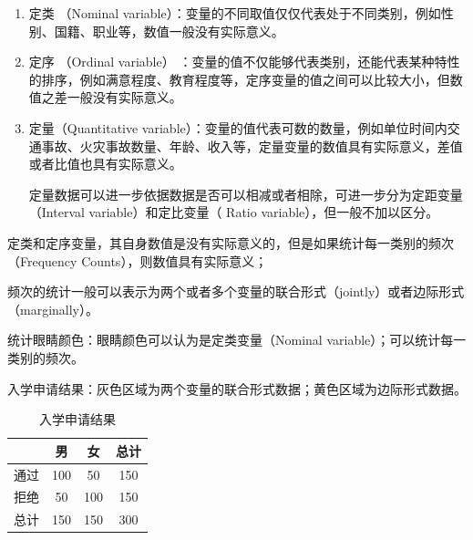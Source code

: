 \begin{enumerate}[itemsep=0pt,parsep=0pt]
    \item 定类 （Nominal variable）：变量的不同取值仅仅代表处于不同类别，例如性别、国籍、职业等，数值一般没有实际意义。
    \item 定序 （Ordinal variable） ：变量的值不仅能够代表类别，还能代表某种特性的排序，例如满意程度、教育程度等，定序变量的值之间可以比较大小，但数值之差一般没有实际意义。
    \item 定量（Quantitative variable）：变量的值代表可数的数量，例如单位时间内交通事故、火灾事故数量、年龄、收入等，定量变量的数值具有实际意义，差值或者比值也具有实际意义。

          定量数据可以进一步依据数据是否可以相减或者相除，可进一步分为定距变量（Interval variable）和定比变量（ Ratio variable），但一般不加以区分。
\end{enumerate}

定类和定序变量，其自身数值是没有实际意义的，但是如果统计每一类别的频次（Frequency Counts），则数值具有实际意义；

频次的统计一般可以表示为两个或者多个变量的联合形式（jointly）或者边际形式（marginally）。

\begin{note}
    统计眼睛颜色：眼睛颜色可以认为是定类变量（Nominal variable）；可以统计每一类别的频次。

    入学申请结果：灰色区域为两个变量的联合形式数据；黄色区域为边际形式数据。

    \begin{table}[h]
        \centering
        \setlength{\tabcolsep}{5mm}
        \begin{tabular}{ccc|c}
            \hline
                                    & \cellcolor{gray!25}男     & \cellcolor{gray!25}女     & \cellcolor{yellow!25} 总计 \\
            \hline
            \cellcolor{gray!25}通过   & \cellcolor{gray!25}100   & \cellcolor{gray!25}50    & \cellcolor{yellow!25}150 \\
            \cellcolor{gray!25}拒绝   & \cellcolor{gray!25}50    & \cellcolor{gray!25}100   & \cellcolor{yellow!25}150 \\
            \hline
            \cellcolor{yellow!25}总计 & \cellcolor{yellow!25}150 & \cellcolor{yellow!25}150 & \cellcolor{yellow!25}300 \\
            \hline
        \end{tabular}
        \caption{入学申请结果}
    \end{table}


\end{note}

